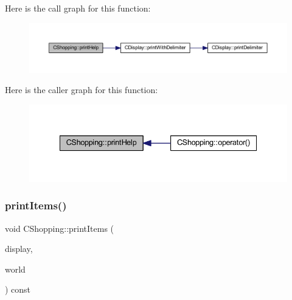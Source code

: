 Here is the call graph for this function\+:\nopagebreak
\begin{figure}[H]
\begin{center}
\leavevmode
\includegraphics[width=350pt]{class_c_shopping_a5d075417297809f43042d74da0fdaad5_cgraph}
\end{center}
\end{figure}
Here is the caller graph for this function\+:\nopagebreak
\begin{figure}[H]
\begin{center}
\leavevmode
\includegraphics[width=335pt]{class_c_shopping_a5d075417297809f43042d74da0fdaad5_icgraph}
\end{center}
\end{figure}
\mbox{\label{class_c_shopping_acfb04014dcfe9b4ddca2206a567112c9}} 
\subsubsection{\texorpdfstring{print\+Items()}{printItems()}}
{\footnotesize\ttfamily void C\+Shopping\+::print\+Items (\begin{DoxyParamCaption}\item[{const \mbox{\hyperlink{class_c_display}{C\+Display}} \&}]{display,  }\item[{const \mbox{\hyperlink{class_c_world}{C\+World}} \&}]{world }\end{DoxyParamCaption}) const\hspace{0.3cm}{\ttfamily [protected]}}

